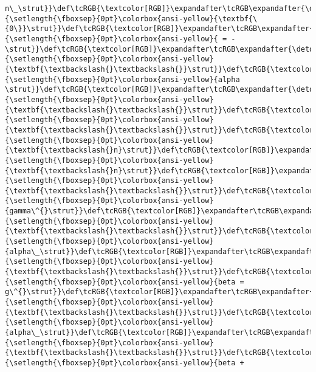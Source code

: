 \documentclass[landscape,letterpaper,10pt,english]{article}
\begin{document}
\begin{Verbatim}[commandchars=\\\{\}, frame=single, framerule=2mm, rulecolor=\color{outerrorbackground}]
n\_\strut}}\def\tcRGB{\textcolor[RGB]}\expandafter\tcRGB\expandafter{\detokenize{175,95,135}}{\setlength{\fboxsep}{0pt}\colorbox{ansi-yellow}{\textbf{\{0\}}\strut}}\def\tcRGB{\textcolor[RGB]}\expandafter\tcRGB\expandafter{\detokenize{175,0,0}}{\setlength{\fboxsep}{0pt}\colorbox{ansi-yellow}{ = -\strut}}\def\tcRGB{\textcolor[RGB]}\expandafter\tcRGB\expandafter{\detokenize{175,95,0}}{\setlength{\fboxsep}{0pt}\colorbox{ansi-yellow}{\textbf{\textbackslash{}\textbackslash{}}\strut}}\def\tcRGB{\textcolor[RGB]}\expandafter\tcRGB\expandafter{\detokenize{175,0,0}}{\setlength{\fboxsep}{0pt}\colorbox{ansi-yellow}{alpha \strut}}\def\tcRGB{\textcolor[RGB]}\expandafter\tcRGB\expandafter{\detokenize{175,95,0}}{\setlength{\fboxsep}{0pt}\colorbox{ansi-yellow}{\textbf{\textbackslash{}\textbackslash{}}\strut}}\def\tcRGB{\textcolor[RGB]}\expandafter\tcRGB\expandafter{\detokenize{175,95,0}}{\setlength{\fboxsep}{0pt}\colorbox{ansi-yellow}{\textbf{\textbackslash{}\textbackslash{}}\strut}}\def\tcRGB{\textcolor[RGB]}\expandafter\tcRGB\expandafter{\detokenize{175,95,0}}{\setlength{\fboxsep}{0pt}\colorbox{ansi-yellow}{\textbf{\textbackslash{}n}\strut}}\def\tcRGB{\textcolor[RGB]}\expandafter\tcRGB\expandafter{\detokenize{175,95,0}}{\setlength{\fboxsep}{0pt}\colorbox{ansi-yellow}{\textbf{\textbackslash{}n}\strut}}\def\tcRGB{\textcolor[RGB]}\expandafter\tcRGB\expandafter{\detokenize{175,95,0}}{\setlength{\fboxsep}{0pt}\colorbox{ansi-yellow}{\textbf{\textbackslash{}\textbackslash{}}\strut}}\def\tcRGB{\textcolor[RGB]}\expandafter\tcRGB\expandafter{\detokenize{175,0,0}}{\setlength{\fboxsep}{0pt}\colorbox{ansi-yellow}{gamma\^{}\strut}}\def\tcRGB{\textcolor[RGB]}\expandafter\tcRGB\expandafter{\detokenize{175,95,0}}{\setlength{\fboxsep}{0pt}\colorbox{ansi-yellow}{\textbf{\textbackslash{}\textbackslash{}}\strut}}\def\tcRGB{\textcolor[RGB]}\expandafter\tcRGB\expandafter{\detokenize{175,0,0}}{\setlength{\fboxsep}{0pt}\colorbox{ansi-yellow}{alpha\_\strut}}\def\tcRGB{\textcolor[RGB]}\expandafter\tcRGB\expandafter{\detokenize{175,95,0}}{\setlength{\fboxsep}{0pt}\colorbox{ansi-yellow}{\textbf{\textbackslash{}\textbackslash{}}\strut}}\def\tcRGB{\textcolor[RGB]}\expandafter\tcRGB\expandafter{\detokenize{175,0,0}}{\setlength{\fboxsep}{0pt}\colorbox{ansi-yellow}{beta = g\^{}\strut}}\def\tcRGB{\textcolor[RGB]}\expandafter\tcRGB\expandafter{\detokenize{175,95,0}}{\setlength{\fboxsep}{0pt}\colorbox{ansi-yellow}{\textbf{\textbackslash{}\textbackslash{}}\strut}}\def\tcRGB{\textcolor[RGB]}\expandafter\tcRGB\expandafter{\detokenize{175,0,0}}{\setlength{\fboxsep}{0pt}\colorbox{ansi-yellow}{alpha\_\strut}}\def\tcRGB{\textcolor[RGB]}\expandafter\tcRGB\expandafter{\detokenize{175,95,0}}{\setlength{\fboxsep}{0pt}\colorbox{ansi-yellow}{\textbf{\textbackslash{}\textbackslash{}}\strut}}\def\tcRGB{\textcolor[RGB]}\expandafter\tcRGB\expandafter{\detokenize{175,0,0}}{\setlength{\fboxsep}{0pt}\colorbox{ansi-yellow}{beta + 
\end{Verbatim}
\end{document}
